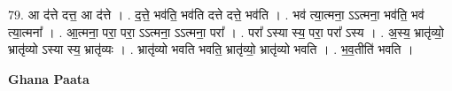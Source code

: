 \documentclass[17pt]{extarticle}
\begin{document}
79. आ द॑त्ते दत्त॒ आ द॑त्ते । . द॒त्ते॒ भव॑ति॒ भव॑ति दत्ते दत्ते॒ भव॑ति । . भव॑ त्या॒त्मना॒ ऽऽत्मना॒ भव॑ति॒ भव॑ त्या॒त्मना᳚ । . आ॒त्मना॒ परा॒ परा॒ ऽऽत्मना॒ ऽऽत्मना॒ परा᳚ । . परा᳚ ऽस्या स्य॒ परा॒ परा᳚ ऽस्य । . अ॒स्य॒ भ्रातृ॑व्यो॒ भ्रातृ॑व्यो ऽस्या स्य॒ भ्रातृ॑व्यः । . भ्रातृ॑व्यो भवति भवति॒ भ्रातृ॑व्यो॒ भ्रातृ॑व्यो भवति । . भ॒व॒तीति॑ भवति । \newline

\textbf{Ghana Paata } \newline
\end{document}
